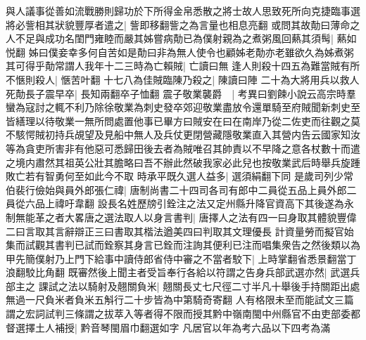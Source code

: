 與人議事從善如流戰勝則歸功於下所得金帛悉散之將士故人思致死所向克捷臨事選將必訾相其狀貌豐厚者遣之|{
	訾即移翻訾之為言量也相息亮翻}
或問其故勣曰薄命之人不足與成功名閨門雍睦而嚴其姊嘗病勣已為僕射親為之煮粥風回爇其須髩|{
	爇如悦翻}
姊曰僕妾幸多何自苦如是勣曰非為無人使令也顧姊老勣亦老雖欲久為姊煮粥其可得乎勣常謂人我年十二三時為亡賴賊|{
	亡讀曰無}
逢人則殺十四五為難當賊有所不愜則殺人|{
	愜苦叶翻}
十七八為佳賊臨陳乃殺之|{
	陳讀曰陣}
二十為大將用兵以救人死勣長子震早卒|{
	長知兩翻卒子恤翻}
震子敬業襲爵　|{
	考異曰劉餗小說云高宗時羣蠻為寇討之輒不利乃除徐敬業為刺史發卒郊迎敬業盡放令還單騎至府賊聞新刺史至皆繕理以待敬業一無所問處置他事已畢方曰賊安在曰在南岸乃從二佐吏而往觀之莫不駭愕賊初持兵覘望及見船中無人及兵仗更閉營藏隱敬業直入其營内告云國家知汝等為貪吏所害非有他惡可悉歸田後去者為賊唯召其帥責以不早降之意各杖數十而遣之境内肅然其祖英公壯其膽略曰吾不辦此然破我家必此兒也按敬業武后時舉兵旋踵敗亡若有智勇何至如此今不取}
時承平既久選人益多|{
	選須絹翻下同}
是歲司列少常伯裴行儉始與員外郎張仁禕|{
	唐制尚書二十四司各司有郎中二員從五品上員外郎二員從六品上禕吁韋翻}
設長名姓歷牓引銓注之法又定州縣升降官資高下其後遂為永制無能革之者大畧唐之選法取人以身言書判|{
	唐擇人之法有四一曰身取其體貌豐偉二曰言取其言辭辯正三曰書取其楷法遒美四曰判取其文理優長}
計資量勞而擬官始集而試觀其書判已試而銓察其身言已銓而注詢其便利已注而唱集衆告之然後類以為甲先簡僕射乃上門下給事中讀侍郎省侍中審之不當者駮下|{
	上時掌翻省悉景翻當丁浪翻駮比角翻}
既審然後上聞主者受旨奉行各給以符謂之告身兵部武選亦然|{
	武選兵部主之}
課試之法以騎射及翹關負米|{
	翹關長丈七尺徑二寸半凡十舉後手持關距出處無過一尺負米者負米五斛行二十步皆為中第騎奇寄翻}
人有格限未至而能試文三篇謂之宏詞試判三條謂之拔萃入等者得不限而授其黔中嶺南閩中州縣官不由吏部委都督選擇土人補授|{
	黔音琴閩眉巾翻選如字}
凡居官以年為考六品以下四考為滿

